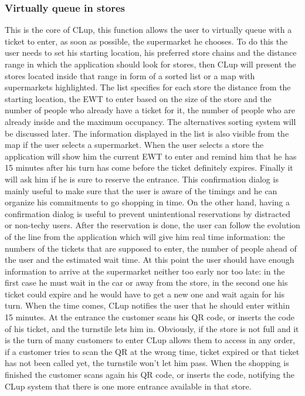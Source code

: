 \subsubsection{\sffamily Virtually queue in stores}
This is the core of CLup, this function allows the user to virtually queue with a ticket to enter, as soon as possible, the supermarket he chooses. To do this the user needs to set his starting location, his preferred store chains and the distance range in which the application should look for stores, then CLup will present the stores located inside that range in form of a sorted list or a map with supermarkets highlighted. The list specifies for each store the distance from the starting location, the EWT to enter based on the size of the store and the number of people who already have a ticket for it, the number of people who are already inside and the maximum occupancy. The alternatives sorting system will be discussed later. The information displayed in the list is also visible from the map if the user selects a supermarket. When the user selects a store the application will show him the current EWT to enter and remind him that he has 15 minutes after his turn has come before the ticket definitely expires. Finally it will ask him if he is sure to reserve the entrance. This confirmation dialog is mainly useful to make sure that the user is aware of the timings and he can organize his commitments to go shopping in time. On the other hand, having a confirmation dialog is useful to prevent unintentional reservations by distracted or non-techy users. After the reservation is done, the user can follow the evolution of the line from the application which will give him real time information: the numbers of the tickets that are supposed to enter, the number of people ahead of the user and the estimated wait time. At this point the user should have enough information to arrive at the supermarket neither too early nor too late: in the first case he must wait in the car or away from the store, in the second one his ticket could expire and he would have to get a new one and wait again for his turn. When the time comes, CLup notifies the user that he should enter within 15 minutes. At the entrance the customer scans his QR code, or inserts the code of his ticket, and the turnstile lets him in. Obviously, if the store is not full and it is the turn of many customers to enter CLup allows them to access in any order, if a customer tries to scan the QR at the wrong time, ticket expired or that ticket has not been called yet, the turnstile won’t let him pass. When the shopping is finished the customer scans again his QR code, or inserts the code, notifying the CLup system that there is one more entrance available in that store.
